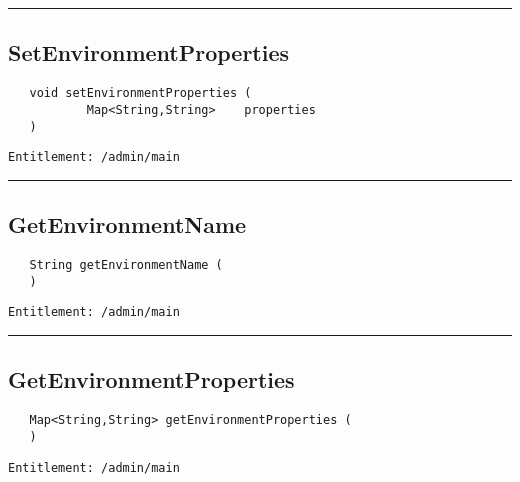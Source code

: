 \rule{12cm}{2pt}
\subsection{SetEnvironmentProperties}
\label{Api:SetEnvironmentProperties}
\begin{verbatim}
   void setEnvironmentProperties (
           Map<String,String>    properties
   )
\end{verbatim}
\begin{Verbatim}[fontsize=\small, formatcom=\color{Maroon}]
  Entitlement: /admin/main
\end{Verbatim}



\rule{12cm}{2pt}
\subsection{GetEnvironmentName}
\label{Api:GetEnvironmentName}
\begin{verbatim}
   String getEnvironmentName (
   )
\end{verbatim}
\begin{Verbatim}[fontsize=\small, formatcom=\color{Maroon}]
  Entitlement: /admin/main
\end{Verbatim}



\rule{12cm}{2pt}
\subsection{GetEnvironmentProperties}
\label{Api:GetEnvironmentProperties}
\begin{verbatim}
   Map<String,String> getEnvironmentProperties (
   )
\end{verbatim}
\begin{Verbatim}[fontsize=\small, formatcom=\color{Maroon}]
  Entitlement: /admin/main
\end{Verbatim}



